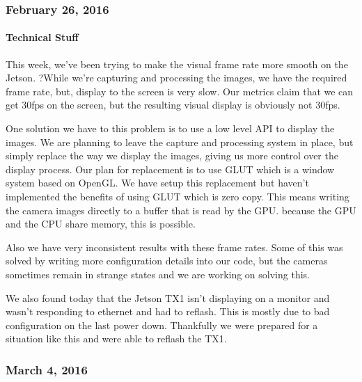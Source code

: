 \subsubsection{February 26, 2016}
\paragraph{Technical Stuff}
This week, we've been trying to make the visual frame rate more smooth on the Jetson. ?While we're capturing and processing the images, we have the required frame rate, but, display to the screen is very slow. Our metrics claim that we can get 30fps on the screen, but the resulting visual display is obviously not 30fps.
\par
One solution we have to this problem is to use a low level API to display the images. We are planning to leave the capture and processing system in place, but simply replace the way we display the images, giving us more control over the display process. Our plan for replacement is to use GLUT which is a window system based on OpenGL. We have setup this replacement but haven't implemented the benefits of using GLUT which is zero copy. This means writing the camera images directly to a buffer that is read by the GPU. because the GPU and the CPU share memory, this is possible.
\par
Also we have very inconsistent results with these frame rates. Some of this was solved by writing more configuration details into our code, but the cameras sometimes remain in strange states and we are working on solving this.
\par
We also found today that the Jetson TX1 isn't displaying on a monitor and wasn't responding to ethernet and had to reflash. This is mostly due to bad configuration on the last power down. Thankfully we were prepared for a situation like this and were able to reflash the TX1.\\

\subsubsection{March 4, 2016}
